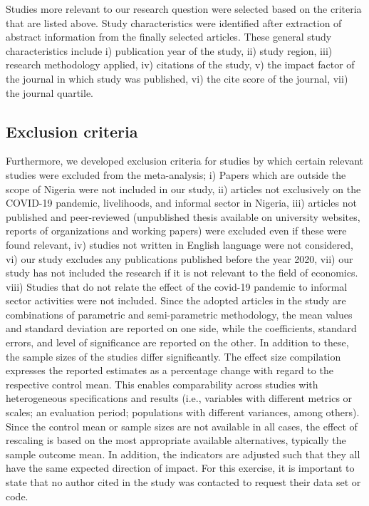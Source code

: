 \documentclass[a4paper, 12pt]{article}
\begin{document}
    Studies more relevant to our research question were selected based on the criteria that are listed above. Study characteristics were identified after extraction of abstract information from the finally selected articles. These general study characteristics include i) publication year of the study, ii) study region, iii) research methodology applied, iv) citations of the study, v)  the impact factor of the journal in which study was published, vi) the cite score of the journal, vii) the journal quartile.

    \subsection{Exclusion criteria}\label{subsec2.2:exclusion-criteria-for-the-studies-in-the-meta-analysis-inclusion-criteria}
    Furthermore, we developed exclusion criteria for studies by which certain relevant studies were excluded from the meta-analysis; i) Papers which are outside the scope of Nigeria were not included in our study, ii) articles not exclusively on the COVID-19 pandemic, livelihoods, and informal sector in Nigeria, iii) articles not published and peer-reviewed (unpublished thesis available on university websites, reports of organizations and working papers) were excluded even if these were found relevant, iv) studies not written in English language were not considered, vi) our study excludes any publications published before the year 2020, vii) our study has not included the research if it is not relevant to the field of economics. viii) Studies that do not relate the effect of the covid-19 pandemic to informal sector activities were not included. Since the adopted articles in the study are combinations of parametric and semi-parametric methodology, the mean values and standard deviation are reported on one side, while the coefficients, standard errors, and level of significance are reported on the other. In addition to these, the sample sizes of the studies differ significantly. The effect size compilation expresses the reported estimates as a percentage change with regard to the respective control mean. This enables comparability across studies with heterogeneous specifications and results (i.e., variables with different metrics or scales; an evaluation period; populations with different variances, among others). Since the control mean or sample sizes are not available in all cases, the effect of rescaling is based on the most appropriate available alternatives, typically the sample outcome mean. In addition, the indicators are adjusted such that they all have the same expected direction of impact. For this exercise, it is important to state that no author cited in the study was contacted to request their data set or code.
\end{document}
